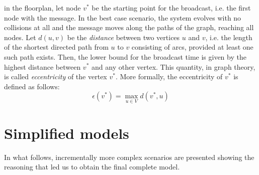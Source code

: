 in the floorplan, let node $v^{*}$ be the starting point for the broadcast, i.e.
the first node with the message. In the best case scenario, the system evolves
with no collisions at all and the message moves along the paths of the graph,
reaching all nodes. Let $d(u, v)$ be the \textit{distance} between two vertices
$u$ and $v$, i.e. the length of the shortest directed path from $u$ to $v$
consisting of arcs, provided at least one such path exists. Then, the lower
bound for the broadcast time is given by the highest distance between $v^{*}$
and any other vertex. This quantity, in graph theory, is called
\textit{eccentricity} of the vertex $v^{*}$. More formally, the eccentricity of
$v^{*}$ is defined as follows:
\begin{equation}
\epsilon(v^{*}) = \max_{u{\in}V} d(v^{*}, u)
\end{equation}
\section{Simplified models}
In what follows, incrementally more complex scenarios are presented showing the
reasoning that led us to obtain the final complete model.
